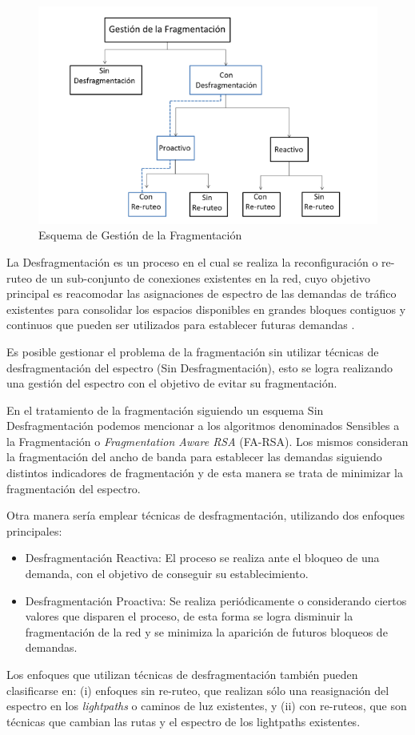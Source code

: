 \begin{figure}
    \centering
    \includegraphics[width=1\textwidth]{capitulos/img/Gestion_Fragmentacion.PNG}
    \caption{Esquema de Gestión de la Fragmentación}
    \label{fig:gestion_fragmentacion}
\end{figure}

La Desfragmentación es un proceso en el cual se realiza la reconfiguración o re-ruteo de un sub-conjunto de conexiones existentes en la red, cuyo objetivo principal es reacomodar las asignaciones de espectro de las demandas de tráfico existentes
para consolidar los espacios disponibles en grandes bloques contiguos y continuos que pueden ser utilizados para establecer futuras demandas \cite{talebi2014spectrum}.

Es posible gestionar el problema de la fragmentación sin utilizar técnicas de desfragmentación del espectro (Sin Desfragmentación), esto se logra realizando una gestión del espectro con el objetivo de evitar su fragmentación.

En el tratamiento de la fragmentación siguiendo un esquema Sin Desfragmentación podemos mencionar a los algoritmos denominados Sensibles a la Fragmentación o \textit{Fragmentation Aware RSA} (FA-RSA). Los mismos consideran la fragmentación del ancho de banda para establecer las demandas siguiendo distintos indicadores de fragmentación y de esta manera se trata de minimizar la fragmentación del espectro.

Otra manera sería emplear técnicas de desfragmentación, utilizando dos enfoques principales:
\begin{itemize}
         \item Desfragmentación Reactiva: El proceso se realiza ante el bloqueo de una demanda, con el objetivo de conseguir su establecimiento.
         \item Desfragmentación Proactiva: Se realiza periódicamente o considerando ciertos valores que disparen el proceso, de esta forma se logra disminuir la fragmentación de la red y se minimiza la aparición de futuros bloqueos de demandas.
\end{itemize}
Los enfoques que utilizan técnicas de desfragmentación también pueden clasificarse en: (i) enfoques sin re-ruteo, que realizan sólo una reasignación del espectro en los \textit{lightpaths} o caminos de luz existentes, y (ii) con re-ruteos, que son técnicas que cambian las rutas y el espectro de los lightpaths existentes.

